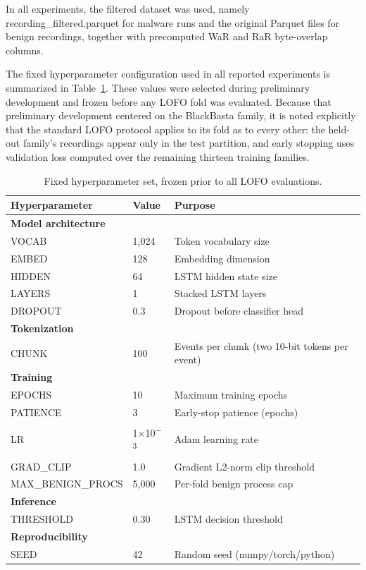 In all experiments, the filtered dataset was used, namely recording\_\allowbreak{}filtered.parquet for malware runs and the original Parquet files for benign recordings, together with precomputed WaR and RaR byte-overlap columns.

The fixed hyperparameter configuration used in all reported experiments is summarized in Table~\ref{tab:4-2}. These values were selected during preliminary development and frozen before any LOFO fold was evaluated. Because that preliminary development centered on the BlackBasta family, it is noted explicitly that the standard LOFO protocol applies to its fold as to every other: the held-out family's recordings appear only in the test partition, and early stopping uses validation loss computed over the remaining thirteen training families.

\begin{table}[htbp]
\centering
\small
\caption{Fixed hyperparameter set, frozen prior to all LOFO evaluations.}\label{tab:4-2}
\begin{tabularx}{\textwidth}{llX}
\hline
\textbf{Hyperparameter} & \textbf{Value} & \textbf{Purpose} \\
\hline
\multicolumn{3}{l}{\textbf{Model architecture}} \\
VOCAB & 1,024 & Token vocabulary size \\
EMBED & 128 & Embedding dimension \\
HIDDEN & 64 & LSTM hidden state size \\
LAYERS & 1 & Stacked LSTM layers \\
DROPOUT & 0.3 & Dropout before classifier head \\
\multicolumn{3}{l}{\textbf{Tokenization}} \\
CHUNK & 100 & Events per chunk (two 10-bit tokens per event) \\
\multicolumn{3}{l}{\textbf{Training}} \\
EPOCHS & 10 & Maximum training epochs \\
PATIENCE & 3 & Early-stop patience (epochs) \\
LR & 1$\times$10\textsuperscript{$-$}\textsuperscript{3} & Adam learning rate \\
GRAD\_\allowbreak{}CLIP & 1.0 & Gradient L2-norm clip threshold \\
MAX\_\allowbreak{}BENIGN\_\allowbreak{}PROCS & 5,000 & Per-fold benign process cap \\
\multicolumn{3}{l}{\textbf{Inference}} \\
THRESHOLD & 0.30 & \textmu{}LSTM decision threshold \\
\multicolumn{3}{l}{\textbf{Reproducibility}} \\
SEED & 42 & Random seed (numpy/\allowbreak{}torch/\allowbreak{}python) \\
\hline
\end{tabularx}
\end{table}

